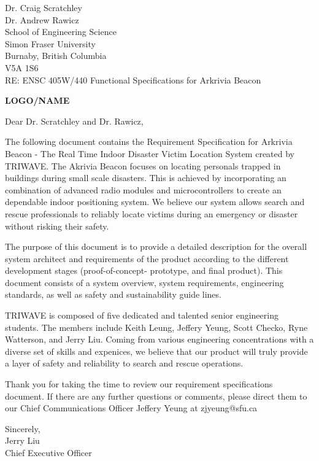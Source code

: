 \documentclass[11pt]{letter}
\date{June 09, 2019}
\begin{document}
\begin{letter}{
Dr. Craig Scratchley\\
Dr. Andrew Rawicz\\
School of Engineering Science\\
Simon Fraser University\\
Burnaby, British Columbia\\
V5A 1S6\\
\bigskip
RE: ENSC 405W/440 Functional Specifications for Arkrivia Beacon\\
} 


\begin{center}
\Huge\bf LOGO/NAME
\bigskip
\end{center} 


\opening{Dear Dr. Scratchley and Dr. Rawicz,} 
 
The following document contains the Requirement Specification for Arkrivia Beacon - The Real Time Indoor Disaster Victim Location System created by TRIWAVE. The Akrivia Beacon focuses on locating personals trapped in buildings during small scale disasters. This is achieved by incorporating an combination of advanced radio modules and microcontrollers to create an dependable indoor positioning system. We believe our system allows search and rescue professionals to reliably locate victims during an emergency or disaster without risking their safety.

The purpose of this document is to provide a detailed description for the overall system architect and requirements of the product according to the different development stages (proof-of-concept- prototype, and final product). This document consists of a system overview, system requirements, engineering standards, as well as safety and sustainability guide lines.

TRIWAVE is composed of five dedicated and talented senior engineering students. The members include Keith Leung, Jeffery Yeung, Scott Checko, Ryne Watterson, and Jerry Liu. Coming
from various engineering concentrations with a diverse set of skills and expenices, we believe that our product will truly provide a layer of safety and reliability to search and rescue operations.

Thank you for taking the time to review our requirement specifications document. If there are any further questions or comments, please direct them to our Chief Communications Officer Jeffery Yeung at zjyeung@sfu.ca

Sincerely,\\
Jerry Liu\\
Chief Executive Officer\\


\end{letter}
\end{document}
